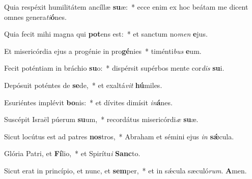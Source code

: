 Quia respéxit humilitátem ancíllæ \textbf{su}æ:~* ecce enim ex hoc beátam me dicent omnes genera\textit{ti}\textbf{ó}nes.

Quia fecit mihi magna qui \textbf{pot}ens est:~* et sanctum no\textit{men} \textbf{e}jus.

Et misericórdia ejus a progénie in pro\textbf{gé}nies~* timénti\textit{bus} \textbf{e}um.

Fecit poténtiam in bráchio \textbf{su}o:~* dispérsit supérbos mente cor\textit{dis} \textbf{su}i.

Depósuit poténtes de \textbf{se}de,~* et exaltá\textit{vit} \textbf{hú}miles.

Esuriéntes implévit \textbf{bo}nis:~* et dívites dimísit \textit{in}\textbf{á}nes.

Suscépit Israël púerum \textbf{su}um,~* recordátus misericórdi\textit{æ} \textbf{su}æ.

Sicut locútus est ad patres \textbf{nos}tros,~* Abraham et sémini ejus \textit{in} \textbf{sǽ}cula.

Glória Patri, et \textbf{Fí}lio,~* et Spirítu\textit{i} \textbf{Sanc}to.

Sicut erat in princípio, et nunc, et \textbf{sem}per,~* et in sǽcula sæculó\textit{rum}. \textbf{A}men.
